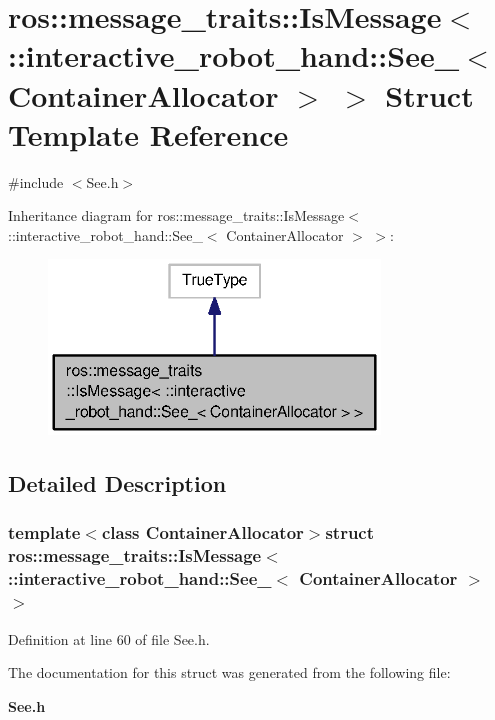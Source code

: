 \section{ros\-:\-:message\-\_\-traits\-:\-:Is\-Message$<$ \-:\-:interactive\-\_\-robot\-\_\-hand\-:\-:See\-\_\-$<$ Container\-Allocator $>$ $>$ Struct Template Reference}
\label{structros_1_1message__traits_1_1IsMessage_3_01_1_1interactive__robot__hand_1_1See___3_01ContainerAllocator_01_4_01_4}


{\ttfamily \#include $<$See.\-h$>$}



Inheritance diagram for ros\-:\-:message\-\_\-traits\-:\-:Is\-Message$<$ \-:\-:interactive\-\_\-robot\-\_\-hand\-:\-:See\-\_\-$<$ Container\-Allocator $>$ $>$\-:\nopagebreak
\begin{figure}[H]
\begin{center}
\leavevmode
\includegraphics[width=250pt]{structros_1_1message__traits_1_1IsMessage_3_01_1_1interactive__robot__hand_1_1See___3_01Containeed6d7ccd8c9d6d241ceda1a85c145c72}
\end{center}
\end{figure}


\subsection{Detailed Description}
\subsubsection*{template$<$class Container\-Allocator$>$struct ros\-::message\-\_\-traits\-::\-Is\-Message$<$ \-::interactive\-\_\-robot\-\_\-hand\-::\-See\-\_\-$<$ Container\-Allocator $>$ $>$}



Definition at line 60 of file See.\-h.



The documentation for this struct was generated from the following file\-:\begin{DoxyCompactItemize}
\item 
{\bf See.\-h}\end{DoxyCompactItemize}
